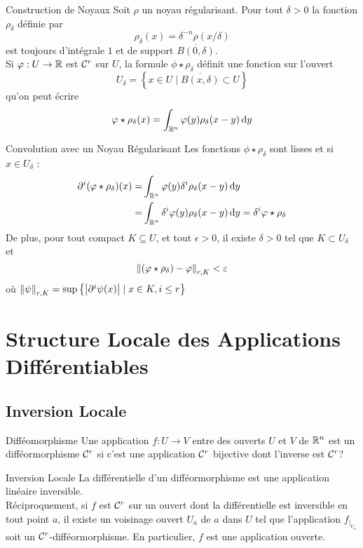 \documentclass{cours}
\begin{document}
\begin{définition}{Construction de Noyaux}{}
    Soit $\rho$ un noyau régularisant. Pour tout $\delta > 0$ la fonction $\rho_{\delta}$ définie par 
    \[
        \rho_{\delta}(x) = \delta^{-n}\rho(x/\delta)
    \]
    est toujours d'intégrale $1$ et de support $\overline{B(0, \delta)}$.\\
    Si $\varphi : U \to \mathbb{R}$ est $\mathcal{C}^{r}$ sur $U$, la formule $\phi \star \rho_{\delta}$ définit une fonction sur l'ouvert
    \[
        U_{\delta} = \left\{x \in U \mid \overline{B(x, \delta)} \subset U\right\}
    \]
    qu'on peut écrire
    \[
        \varphi \star \rho_{\delta}(x) = \int_{\mathbb{R}^{n}}\varphi(y)\rho_{\delta}(x - y){\rm \, d} y
    \]
\end{définition}

\begin{propositionfr}{Convolution avec un Noyau Régularisant}{}
    Les fonctions $\phi \star \rho_{\delta}$ sont lisses et si $x \in U_{\delta}$ :
    \[
        \begin{aligned}
            \partial^{i}(\varphi \star \rho_{\delta})(x) =& \int_{\mathbb{R}^{n}}\varphi(y)\delta^{i}\rho_{\delta}(x - y){\rm \, d} y\\
            = & \int_{\mathbb{R}^{n}}\delta^{i}\varphi(y)\rho_{\delta}(x - y){\rm \, d} y = \delta^{i}\varphi \star \rho_{\delta}
        \end{aligned}
    \]
    De plus, pour tout compact $K \subseteq U$, et tout $\epsilon > 0$, il existe $\delta > 0$ tel que $K \subset U_{\delta}$ et
    \[
        \left\lVert \left(\varphi \star \rho_{\delta}\right) - \varphi \right\rVert_{r, K} < \varepsilon
    \]
    où $\left\lVert \psi \right\rVert_{r, K} = \sup\left\{\left|\partial^{i}\psi(x)\right|\mid x \in K, i \leq r\right\}$
\end{propositionfr}

\section{Structure Locale des Applications Différentiables}
\subsection{Inversion Locale}
\begin{définition}{Difféomorphisme}{}
    Une application $f : U \to V$ entre des ouverts $U$ et $V$ de $\mathbb{R}^{n}$ est un difféormorphisme $\mathcal{C}^{r}$ si c'est une application $\mathcal{C}^{r}$ bijective dont l'inverse est $\mathcal{C}^{r}$?    
\end{définition}
\begin{théorème}{Inversion Locale}{}
    La différentielle d'un difféormorphisme est une application linéaire inversible. \\
    Réciproquement, si $f$ est $\mathcal{C}^{r}$ sur un ouvert dont la différentielle est inversible en tout point $a$, il existe un voisinage ouvert $U_{a}$ de $a$ dans $U$ tel que l'application $f_{\mid_{U_{a}}}$ soit un $\mathcal{C}^{r}$-difféormorphisme. En particulier, $f$ est une application ouverte. 
\end{théorème}
\end{document}
